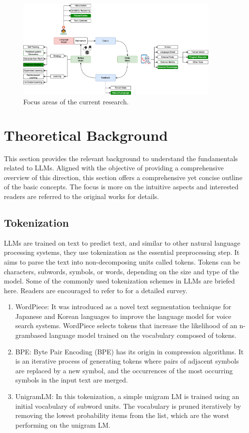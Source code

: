 \documentclass[a4paper,oneside]{book}
\begin{document}
\begin{figure}[!htb]
    \centering
    \includegraphics[width=0.90\textwidth]{img/direction_of_research}
    \caption{Focus areas of the current research.}\label{fig:direction_of_research}
\end{figure}

\chapter{Theoretical Background}
This section provides the relevant background to understand the fundamentals related to LLMs. Aligned with the objective of providing a comprehensive overview of this direction, this section offers a comprehensive yet concise outline of the basic concepts. The focus is more on the intuitive aspects and interested readers are referred to the original works for details.

\section{Tokenization}
LLMs are trained on text to predict text, and similar to other natural language processing systems, they use tokenization as the essential preprocessing step. It aims to parse the text into non-decomposing units called tokens. Tokens can be characters, subwords, symbols, or words, depending on the size and type of the model. Some of the commonly used tokenization schemes in LLMs are briefed here. Readers are encouraged to refer to for a detailed survey.

\begin{enumerate}
    \item WordPiece: It was introduced as a novel text segmentation technique for Japanese and Korean languages to improve the language model for voice search systems. WordPiece selects tokens that increase the likelihood of an n-grambased language model trained on the vocabulary composed of tokens.

    \item BPE: Byte Pair Encoding (BPE) has its origin in compression algorithms. It is an iterative process of generating tokens where pairs of adjacent symbols are replaced by a new symbol, and the occurrences of the most occurring symbols in the input text are merged.

    \item UnigramLM: In this tokenization, a simple unigram LM is trained using an initial vocabulary of subword units. The vocabulary is pruned iteratively by removing the lowest probability items from the list, which are the worst performing on the unigram LM.
\end{enumerate}
\end{document}
